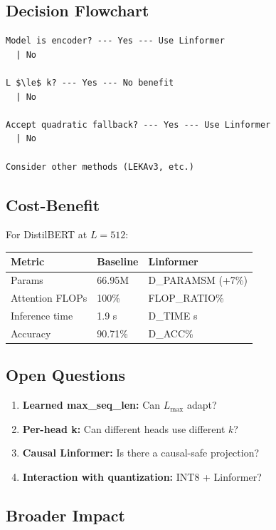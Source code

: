\subsection{Decision Flowchart}

\begin{lstlisting}
Model is encoder? --- Yes --- Use Linformer
  | No
   
L $\le$ k? --- Yes --- No benefit
  | No
   
Accept quadratic fallback? --- Yes --- Use Linformer
  | No
   
Consider other methods (LEKAv3, etc.)
\end{lstlisting}

\subsection{Cost-Benefit}

For DistilBERT at $L = 512$:

\begin{table}[H]
\centering
\small
\begin{tabular}{lll}
\toprule
\textbf{Metric} & \textbf{Baseline} & \textbf{Linformer} \\
\midrule
Params & 66.95M & {{D\_PARAMS}}M (+7\%) \\
Attention FLOPs & 100\% & {{FLOP\_RATIO}}\% \\
Inference time & 1.9 s & {{D\_TIME}} s \\
Accuracy & 90.71\% & {{D\_ACC}}\% \\
\bottomrule
\end{tabular}
\end{table}

\subsection{Open Questions}

\begin{enumerate}
\item \textbf{Learned max\_seq\_len:} Can $L_\text{max}$ adapt?
\item \textbf{Per-head k:} Can different heads use different $k$?
\item \textbf{Causal Linformer:} Is there a causal-safe projection?
\item \textbf{Interaction with quantization:} INT8 + Linformer?

\end{enumerate}
\subsection{Broader Impact}

